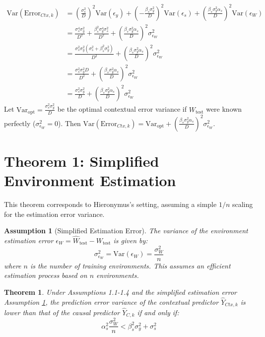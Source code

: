 \documentclass[11pt]{article}
\newtheorem{theorem}{Theorem}[section]
\newtheorem{assumption}{Assumption}[section]
\newcommand{\Var}{\mathrm{Var}}
\begin{document}
\begin{align}
    \Var(\text{Error}_{Ctx,k}) &= \left(\frac{\sigma_s^2}{D}\right)^2 \Var(\epsilon_y) + \left(-\frac{\beta_s \sigma_y^2}{D}\right)^2 \Var(\epsilon_s) + \left(\frac{\beta_s \sigma_y^2 \alpha_s}{D}\right)^2 \Var(\epsilon_W) \nonumber \\
    &= \frac{\sigma_s^4 \sigma_y^2}{D^2} + \frac{\beta_s^2 \sigma_y^4 \sigma_s^2}{D^2} + \left(\frac{\beta_s \sigma_y^2 \alpha_s}{D}\right)^2 \sigma_{\epsilon_W}^2 \nonumber \\
    &= \frac{\sigma_s^2 \sigma_y^2 (\sigma_s^2 + \beta_s^2 \sigma_y^2)}{D^2} + \left(\frac{\beta_s \sigma_y^2 \alpha_s}{D}\right)^2 \sigma_{\epsilon_W}^2 \nonumber \\
    &= \frac{\sigma_s^2 \sigma_y^2 D}{D^2} + \left(\frac{\beta_s \sigma_y^2 \alpha_s}{D}\right)^2 \sigma_{\epsilon_W}^2 \nonumber \\
    &= \frac{\sigma_s^2 \sigma_y^2}{D} + \left(\frac{\beta_s \sigma_y^2 \alpha_s}{D}\right)^2 \sigma_{\epsilon_W}^2 \label{eq:contextual_var_general}
\end{align}
Let $\Var_{\text{opt}} = \frac{\sigma_s^2 \sigma_y^2}{D}$ be the optimal contextual error variance if $W_{\text{test}}$ were known perfectly ($\sigma_{\epsilon_W}^2 = 0$). Then $\Var(\text{Error}_{Ctx,k}) = \Var_{\text{opt}} + \left(\frac{\beta_s \sigma_y^2 \alpha_s}{D}\right)^2 \sigma_{\epsilon_W}^2$.

\section{Theorem 1: Simplified Environment Estimation}

This theorem corresponds to Hieronymus's setting, assuming a simple $1/n$ scaling for the estimation error variance.

\begin{assumption}[Simplified Estimation Error]
The variance of the environment estimation error $\epsilon_W = \hat{W}_{\text{test}} - W_{\text{test}}$ is given by:
\[ \sigma_{\epsilon_W}^2 = \Var(\epsilon_W) = \frac{\sigma_W^2}{n} \]
where $n$ is the number of training environments. This assumes an efficient estimation process based on $n$ environments.
\label{ass:simple_error}
\end{assumption}

\begin{theorem}
Under Assumptions 1.1-1.4 and the simplified estimation error Assumption \ref{ass:simple_error}, the prediction error variance of the contextual predictor $\hat{Y}_{Ctx,k}$ is lower than that of the causal predictor $\hat{Y}_{C,k}$ if and only if:
\[ \alpha_s^2 \frac{\sigma_W^2}{n} < \beta_s^2 \sigma_y^2 + \sigma_s^2 \]
\label{thm:simple}
\end{theorem}
\end{document}
